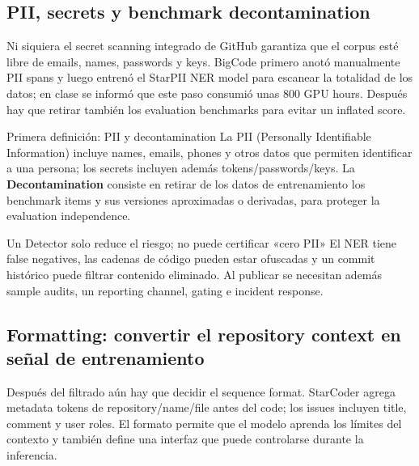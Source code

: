 \subsection{PII, secrets y benchmark decontamination}

Ni siquiera el secret scanning integrado de GitHub garantiza que el corpus esté libre de emails, names, passwords y keys. BigCode primero anotó manualmente PII spans y luego entrenó el StarPII NER model para escanear la totalidad de los datos; en clase se informó que este paso consumió unas 800 GPU hours. Después hay que retirar también los evaluation benchmarks para evitar un inflated score.


\begin{knowledgebox}{Primera definición: PII y decontamination}
La PII (Personally Identifiable Information) incluye names, emails, phones y otros datos que permiten identificar a una persona; los secrets incluyen además tokens/passwords/keys. La \textbf{Decontamination} consiste en retirar de los datos de entrenamiento los benchmark items y sus versiones aproximadas o derivadas, para proteger la evaluation independence.
\end{knowledgebox}

\begin{warningbox}{Un Detector solo reduce el riesgo; no puede certificar «cero PII»}
El NER tiene false negatives, las cadenas de código pueden estar ofuscadas y un commit histórico puede filtrar contenido eliminado. Al publicar se necesitan además sample audits, un reporting channel, gating e incident response.
\end{warningbox}


\subsection{Formatting: convertir el repository context en señal de entrenamiento}

Después del filtrado aún hay que decidir el sequence format. StarCoder agrega metadata tokens de repository/name/file antes del code; los issues incluyen title, comment y user roles. El formato permite que el modelo aprenda los límites del contexto y también define una interfaz que puede controlarse durante la inferencia.

